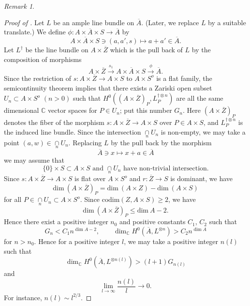 \documentclass[11pt,english]{smfart}
\theoremstyle{plain}
\theoremstyle{definition}
\theoremstyle{remark}
\newtheorem{rem}[thm]{Remark}
\numberwithin{equation}{section}
\theoremstyle{plain}
\begin{document}
\begin{rem}
\begin{proof}[Proof of  ]
Let $L$ be an ample line bundle on $\overline{A}$.
(Later, we replace $L$ by a suitable translate.)
We define $\phi : A\times \overline{A}\times S\to \overline{A}$ by
$$A\times \overline{A}\times S\ni (a,a',s)\mapsto a+a' \in \overline{A}.$$
Let $L^{\dagger}$ be the line bundle on $A\times \overline{Z}$ which is the pull back of $L$ by the composition of morphisms
$$A\times \overline{Z}\overset{ s_1}{\to} A\times \overline{A}\times S\overset{\phi}{\to} \overline{A}.$$
Since the restriction of $s:A\times \overline{Z}\to A\times S$ to $A\times S^o$ is a flat family, the semicontinuity theorem \cite[p.288]{hartshorne1977}
implies
that
there exists a Zariski open subset $U_n\subset A\times S^o$ $(n>0)$ such that $H^0((A\times \overline{Z})_{P},L^{\dagger \otimes n}_{P})$ are all the same dimensional $\mathbb C$ vector spaces for $P\in U_n$; 
put this number $G_n$. 
Here $(A\times \overline{Z})_{P}$ denotes the fiber of the morphism $s:A\times \overline{Z}\to A\times S$ over $P\in A\times S$, and $L^{\dagger \otimes n}_{P}$ is the induced line bundle.
Since the intersection $\underset{n}{\cap}U_n$ is non-empty, we may take a point $(a,w)\in \underset{n}{\cap}U_n$. 
Replacing $L$ by the pull back by the morphism 
$$\overline{A}\ni x \mapsto x+a \in \overline{A}$$
we may assume that 
\begin{equation}\label{eqn:10.29.1}
\text{$\{ 0\}\times S\subset A\times S$ and $\underset{n}{\cap}U_n$ have non-trivial intersection.}
\end{equation}
Since $s:A\times \overline{Z}\to A\times S$ is flat over $A\times S^o$ and $r:\overline{Z}\to S$ is dominant, we have
$$\mathrm{dim}\ (A\times \overline{Z})_{P}=\mathrm{dim}\ (A\times Z)-\mathrm{dim}\ (A\times S)
$$
for all $P\in \underset{n}{\cap}U_n\subset A\times S^o$.
Since $\mathrm{codim}(Z, A\times S)\geq 2$, we have
$$\mathrm{dim}\ (A\times \overline{Z})_{P}\leq \mathrm{dim}\ A-2.$$
Hence there exist a positive integer $n_0$ and positive constants $C_1$, $C_2$ such that
$$G_n<C_1 n^{\dim A -2}, \qquad \dim _{\mathbb C}H^{0}(\overline{A},L^{\otimes n})>C_2 n^{\dim A}$$
for $n>n_0$.
Hence for a positive integer $l$, we may take a positive integer $n(l)$ such that
\begin{equation}\label{eqn:dim}
\dim _{\mathbb C}H^{0}(\overline{A},L^{\otimes n(l)})>(l+1)G_{n(l)}
\end{equation}
and
$$\underset{l\to \infty}{\lim}
\frac{n(l)}{l}\to 0.$$
For instance, $n(l)\sim l^{2/3}$.



\end{proof}
\end{rem}
\end{document}
